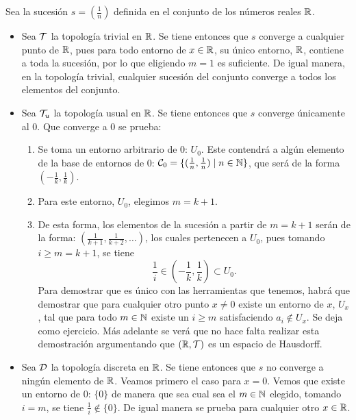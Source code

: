 \begin{ej}
    Sea la sucesión $s = \left(\frac1n\right)$ definida en el conjunto de los números reales $\mathbb{R}$.
    \begin{itemize}[leftmargin=15pt]
        \item Sea $\mathcal{T}$ la topología trivial en $\mathbb{R}$. Se tiene entonces que $s$ converge a cualquier punto de $\mathbb{R}$, pues para todo entorno de $x\in\mathbb{R}$, su único entorno, $\mathbb{R}$, contiene a toda la sucesión, por lo que eligiendo $m = 1$ es suficiente. De igual manera, en la topología trivial, cualquier sucesión del conjunto converge a todos los elementos del conjunto.
        \item Sea $\mathcal{T}_u$ la topología usual en $\mathbb{R}$. Se tiene entonces que $s$ converge únicamente al $0$. Que converge a $0$ se prueba:
        \begin{enumerate}[label=--]
            \item Se toma un entorno arbitrario de $0$: $U_0$. Este contendrá a algún elemento de la base de entornos de $0$: $\mathcal{C}_0 = \{(\frac1n,\frac1n) \mid n \in \mathbb{N}\}$, que será de la forma $(-\frac1k,\frac1k)$.
            \item Para este entorno, $U_0$, elegimos $m = k + 1$.
            \item De esta forma, los elementos de la sucesión a partir de $m = k + 1$ serán de la forma: $\left(\frac{1}{k+1},\frac{1}{k+2},\ldots\right)$, los cuales pertenecen a $U_0$, pues tomando $i\geq m = k + 1$, se tiene \[\frac1i \in (-\frac1k,\frac1k)\subset U_0.\]
            Para demostrar que es único con las herramientas que tenemos, habrá que demostrar que para cualquier otro punto $x\neq 0$ existe un entorno de $x$, $U_x$, tal que para todo $m\in\mathbb{N}$ existe un $i\geq m$ satisfaciendo $a_i \notin U_x$. Se deja como ejercicio. Más adelante se verá que no hace falta realizar esta demostración argumentando que $(\mathbb{R},\mathcal{T})$ es un espacio de Hausdorff.
        \end{enumerate}
        \item Sea $\mathcal{D}$ la topología discreta en $\mathbb{R}$. Se tiene entonces que $s$ no converge a ningún elemento de $\mathbb{R}$. Veamos primero el caso para $x = 0$. Vemos que existe un entorno de $0$: $\{0\}$ de manera que sea cual sea el $m\in\mathbb{N}$ elegido, tomando $i=m$, se tiene $\frac1i\notin \{0\}$. De igual manera se prueba para cualquier otro $x\in\mathbb{R}$.
    \end{itemize}
\end{ej}



